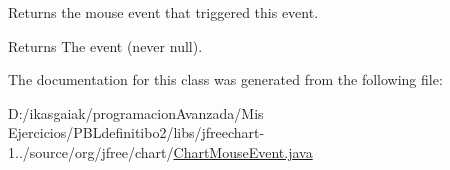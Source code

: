 Returns the mouse event that triggered this event.

\begin{DoxyReturn}{Returns}
The event (never {\ttfamily null}). 
\end{DoxyReturn}


The documentation for this class was generated from the following file\+:\begin{DoxyCompactItemize}
\item 
D\+:/ikasgaiak/programacion\+Avanzada/\+Mis Ejercicios/\+P\+B\+Ldefinitibo2/libs/jfreechart-\/1../source/org/jfree/chart/\mbox{\hyperlink{_chart_mouse_event_8java}{Chart\+Mouse\+Event.\+java}}\end{DoxyCompactItemize}
